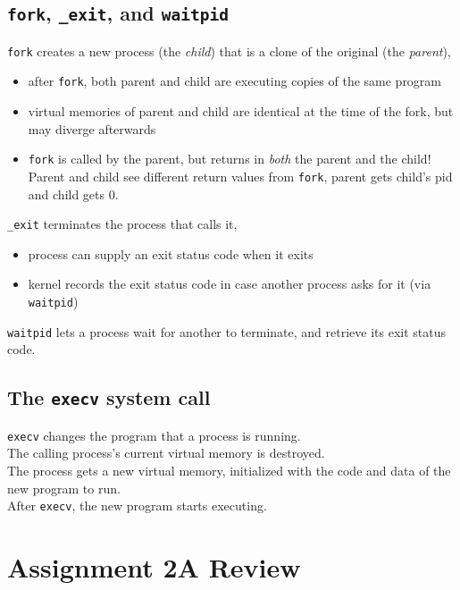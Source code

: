 \documentclass[12pt]{article}
\theoremstyle{plain}
\theoremstyle{definition}
\begin{document}
\subsection{\texttt{fork}, \texttt{\_exit}, and \texttt{waitpid}}
\texttt{fork} creates a new process (the \emph{child}) that is a clone of the original (the \emph{parent}),
\begin{itemize}
  \item after \texttt{fork}, both parent and child are executing copies of the same program
  \item virtual memories of parent and child are identical at the time of the fork, but may diverge afterwards
  \item \texttt{fork} is called by the parent, but returns in \emph{both} the parent and the child! \\
  Parent and child see different return values from \texttt{fork}, parent gets child's pid and child gets 0.
\end{itemize}

\texttt{\_exit} terminates the process that calls it,
\begin{itemize}
  \item process can supply an exit status code when it exits
  \item kernel records the exit status code in case another process asks for it (via \texttt{waitpid})
\end{itemize}

\texttt{waitpid} lets a process wait for another to terminate, and retrieve its exit status code.

\subsection{The \texttt{execv} system call}
\texttt{execv} changes the program that a process is running. \\
The calling process's current virtual memory is destroyed. \\
The process gets a new virtual memory, initialized with the code and data of the new program to run. \\
After \texttt{execv}, the new program starts executing.

\newpage
\section{Assignment 2A Review}
\end{document}
